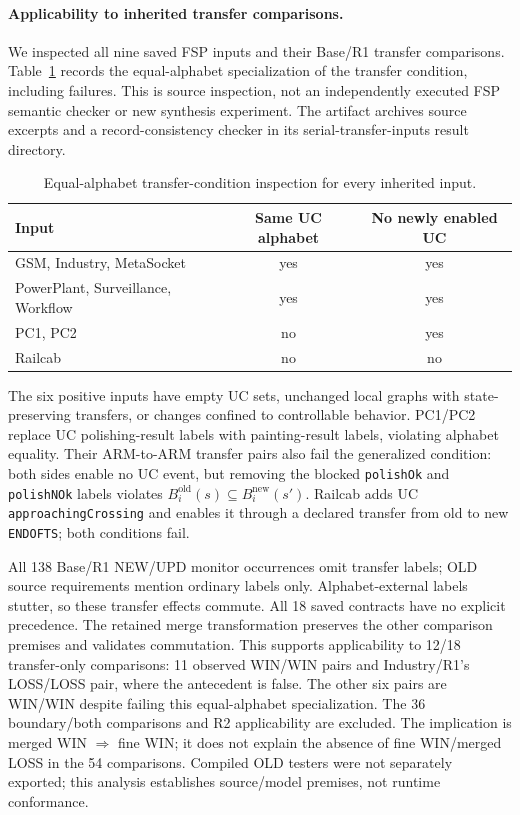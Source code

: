 \paragraph{Applicability to inherited transfer comparisons.}
We inspected all nine saved FSP inputs and their Base/R1 transfer comparisons. Table~\ref{tab:serial-inputs} records the equal-alphabet specialization of the transfer condition, including failures. This is source inspection, not an independently executed FSP semantic checker or new synthesis experiment. The artifact archives source excerpts and a record-consistency checker in its serial-transfer-inputs result directory.
\begin{table}[!htbp]\centering\small
\caption{Equal-alphabet transfer-condition inspection for every inherited input.}\label{tab:serial-inputs}
\begin{tabular}{@{}lcc@{}}\toprule
Input & Same UC alphabet & No newly enabled UC\\\midrule
GSM, Industry, MetaSocket & yes & yes\\
PowerPlant, Surveillance, Workflow & yes & yes\\
PC1, PC2 & no & yes\\
Railcab & no & no\\\bottomrule
\end{tabular}
\end{table}
\FloatBarrier
The six positive inputs have empty UC sets, unchanged local graphs with state-preserving transfers, or changes confined to controllable behavior. PC1/PC2 replace UC polishing-result labels with painting-result labels, violating alphabet equality. Their ARM-to-ARM transfer pairs also fail the generalized condition: both sides enable no UC event, but removing the blocked \texttt{polishOk} and \texttt{polishNOk} labels violates $B_i^{\mathrm{old}}(s)\subseteq B_i^{\mathrm{new}}(s')$. Railcab adds UC \texttt{approachingCrossing} and enables it through a declared transfer from old to new \texttt{ENDOFTS}; both conditions fail.

All 138 Base/R1 NEW/UPD monitor occurrences omit transfer labels; OLD source requirements mention ordinary labels only. Alphabet-external labels stutter, so these transfer effects commute. All 18 saved contracts have no explicit precedence. The retained merge transformation preserves the other comparison premises and validates commutation. This supports applicability to 12/18 transfer-only comparisons: 11 observed WIN/WIN pairs and Industry/R1's LOSS/LOSS pair, where the antecedent is false. The other six pairs are WIN/WIN despite failing this equal-alphabet specialization. The 36 boundary/both comparisons and R2 applicability are excluded. The implication is merged WIN $\Rightarrow$ fine WIN; it does not explain the absence of fine WIN/merged LOSS in the 54 comparisons. Compiled OLD testers were not separately exported; this analysis establishes source/model premises, not runtime conformance.

